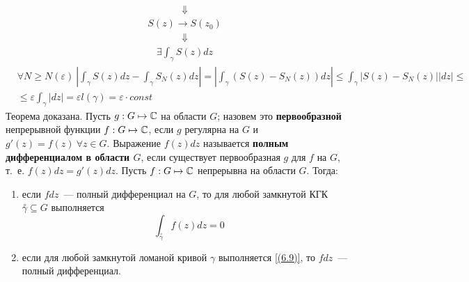 \begin{align*}
  & \Downarrow
\end{align*}
\begin{align*}
  & S(z) \rightarrow S(z_0)
\end{align*}
\begin{align*}
  & \Downarrow
\end{align*}
\begin{align*}
  & \exists \int_{\gamma}S(z)dz
\end{align*}
\begin{align*}
  &\forall N \geq N(\varepsilon) \ \left| \int_{\gamma}S(z)dz - \int_{\gamma}S_N(z)dz\right| = \left| \int_\gamma \left( S(z) - S_N(z) \right)dz\right| \leq \int_\gamma \left| S(z) - S_N(z) \right| \left| dz \right| \leq \\
  & \leq \varepsilon \int_{\gamma} \left| dz \right| = \varepsilon l(\gamma) = \varepsilon \cdot const
\end{align*}
Теорема доказана.
\Def
Пусть $g: G \mapsto \mathbb{C}$ на области $G$; назовем это \textbf{первообразной}
непрерывной функции $f: G \mapsto \mathbb{C}$, если $g$ регулярна на $G$ и $g'(z) =
f(z) \ \forall z \in G$.
\Def
Выражение $f(z)dz$ называется \textbf{полным дифференциалом в области $G$}, если
существует первообразная $g$ для $f$ на $G$, т.~е. $f(z)dz = g'(z)dz$.
\theorem
Пусть $f:G \mapsto \mathbb{C}$ непрерывна на области $G$. Тогда:
\begin{enumerate}
    \item если $f dz$~--- полный дифференциал на $G$, то для любой замкнутой КГК
    $\overset{\circ}{\gamma} \subseteq G$ выполняется
    \begin{equation} \label{(6.9)}
        \int_{\overset{\circ}{\gamma}} f(z) dz = 0
    \end{equation}
    \item если для любой замкнутой ломаной кривой $\gamma$ выполняется
    \eqref{(6.9)}, то $f dz$~--- полный дифференциал.
\end{enumerate}
\pr ~
\\
